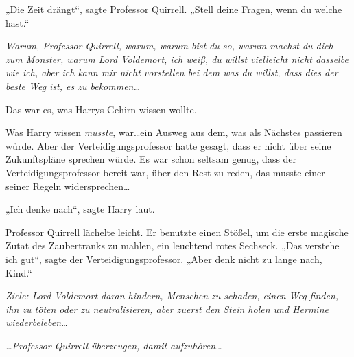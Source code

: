 „Die Zeit drängt“, sagte Professor Quirrell. „Stell deine Fragen, wenn du welche hast.“

\emph{Warum, Professor Quirrell, warum, warum bist du so, warum machst du dich zum Monster, warum Lord Voldemort, ich weiß, du willst vielleicht nicht dasselbe wie ich, aber ich kann mir nicht vorstellen bei dem was du willst, dass \emph{dies} der beste Weg ist, es zu bekommen…}

Das war es, was Harrys Gehirn wissen wollte.

Was Harry wissen \emph{musste}, war…ein Ausweg aus dem, was als Nächstes passieren würde. Aber der Verteidigungsprofessor hatte gesagt, dass er nicht über seine Zukunftspläne sprechen würde. Es war schon seltsam genug, dass der Verteidigungsprofessor bereit war, über den Rest zu reden, das musste einer seiner Regeln widersprechen…

„Ich denke nach“, sagte Harry laut.

Professor Quirrell lächelte leicht. Er benutzte einen Stößel, um die erste magische Zutat des Zaubertranks zu mahlen, ein leuchtend rotes Sechseck.
„Das verstehe ich gut“, sagte der Verteidigungsprofessor. „Aber denk nicht zu lange nach, Kind.“

\emph{Ziele: Lord Voldemort daran hindern, Menschen zu schaden, einen Weg finden, ihn zu töten oder zu neutralisieren, aber zuerst den Stein holen und Hermine wiederbeleben…}

\emph{…Professor Quirrell überzeugen, damit aufzuhören…}

